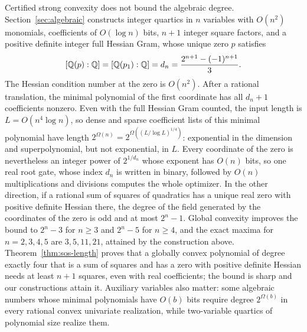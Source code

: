 Certified strong convexity does not bound the algebraic degree.
Section~\ref{sec:algebraic} constructs integer quartics in $n$ variables with
$O(n^2)$ monomials, coefficients of $O(\log n)$ bits, $n+1$ integer square
factors, and a positive definite integer full Hessian Gram, whose unique zero
$p$ satisfies
\[
[\mathbb Q(p):\mathbb Q]=[\mathbb Q(p_1):\mathbb Q]=d_n=\frac{2^{n+1}-(-1)^{n+1}}{3}.
\]
The Hessian condition number at the zero is $O(n^2)$. After a rational
translation, the minimal polynomial of the first coordinate has all $d_n+1$
coefficients nonzero. Even with the full Hessian Gram counted, the input
length is $L=O(n^4\log n)$, so dense and sparse coefficient lists of this
minimal polynomial have length $2^{\Omega(n)}=2^{\Omega((L/\log L)^{1/4})}$:
exponential in the dimension and superpolynomial, but not exponential, in
$L$. Every coordinate of the zero is nevertheless an integer power of
$2^{1/d_n}$ whose exponent has $O(n)$ bits, so one real root gate, whose
index $d_n$ is written in binary, followed by $O(n)$ multiplications and
divisions computes the whole optimizer. In the other direction, if a rational sum of
squares of quadratics has a unique real zero with positive definite Hessian
there, the degree of the field generated by the coordinates of the zero is
odd and at most $2^n-1$. Global convexity improves the bound to $2^n-3$ for
$n\ge3$ and $2^n-5$ for $n\ge4$, and the exact maxima for $n=2,3,4,5$ are
$3,5,11,21$, attained by the construction above.
Theorem~\ref{thm:sos-length} proves that a globally convex polynomial of
degree exactly four that is a sum of squares and has a zero with positive
definite Hessian needs at least $n+1$ squares, even with real coefficients;
the bound is sharp and our constructions attain it. Auxiliary variables also
matter: some algebraic numbers whose minimal polynomials have $O(b)$ bits
require degree $2^{\Omega(b)}$ in every rational convex univariate
realization, while two-variable quartics of polynomial size realize them.


